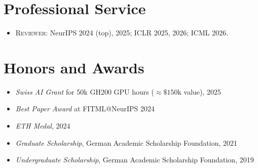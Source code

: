 \documentclass[a4paper,11pt]{article}
\begin{document}
\section*{Professional Service}
\begin{itemize}[leftmargin=1.5em]
  \item \textsc{Reviewer:} NeurIPS 2024 (top), 2025; ICLR 2025, 2026; ICML 2026.
\end{itemize}

\section*{Honors and Awards}
\begin{itemize}[leftmargin=1.5em]
  \item \emph{Swiss AI Grant} for 50k GH200 GPU hours ($\approx\!\$150\mathrm{k}$ value), 2025
  \item \emph{Best Paper Award} at FITML@NeurIPS 2024
  \item \emph{ETH Medal}, 2024
  \item \emph{Graduate Scholarship}, German Academic Scholarship Foundation, 2021
  \item \emph{Undergraduate Scholarship}, German Academic Scholarship Foundation, 2019
\end{itemize}
\end{document}
